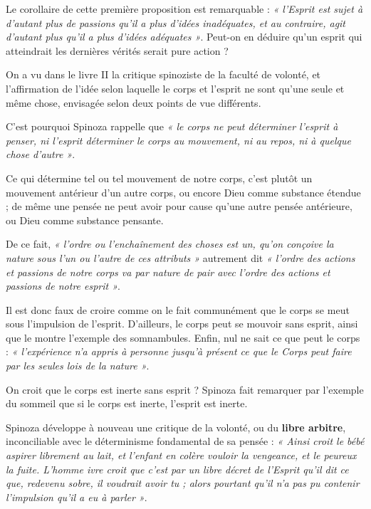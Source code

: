 Le corollaire de cette première proposition est remarquable : {\it « l’Esprit est
sujet à d’autant plus de passions qu’il a plus d’idées inadéquates, et au
contraire, agit d’autant plus qu’il a plus d’idées adéquates »}. Peut-on en
déduire qu’un esprit qui atteindrait les dernières vérités serait pure action ?

\vspace{0.5cm}
On a vu dans le livre II la critique spinoziste de la faculté de volonté, et
l’affirmation de l’idée selon laquelle le corps et l’esprit ne sont qu’une
seule et même chose, envisagée selon deux points de vue différents.

C’est pourquoi Spinoza rappelle que {\it « le corps ne peut déterminer l’esprit à
penser, ni l’esprit déterminer le corps au mouvement, ni au repos, ni à quelque
chose d’autre »}.

Ce qui détermine tel ou tel mouvement de notre corps, c’est plutôt un mouvement
antérieur d’un autre corps, ou encore Dieu comme substance étendue ; de même
une pensée ne peut avoir pour cause qu’une autre pensée antérieure, ou Dieu
comme substance pensante.

\vspace{0.5cm}
De ce fait, {\it « l’ordre ou l’enchaînement des choses est un, qu’on conçoive la
nature sous l’un ou l’autre de ces attributs »} autrement dit {\it « l’ordre des
actions et passions de notre corps va par nature de pair avec l’ordre des
actions et passions de notre esprit »}.

Il est donc faux de croire comme on le fait communément que le corps se meut
sous l’impulsion de l’esprit. D’ailleurs, le corps peut se mouvoir sans esprit,
ainsi que le montre l’exemple des somnambules. Enfin, nul ne sait ce que peut
le corps : {\it « l’expérience n’a appris à personne jusqu’à présent ce que le Corps
peut faire par les seules lois de la nature »}.

On croit que le corps est inerte sans esprit ? Spinoza fait remarquer par
l’exemple du sommeil que si le corps est inerte, l’esprit est inerte.

\vspace{0.5cm}
Spinoza développe à nouveau une critique de la volonté, ou du {\bf libre arbitre},
inconciliable avec le déterminisme fondamental de sa pensée : {\it « Ainsi croit le
bébé aspirer librement au lait, et l’enfant en colère vouloir la vengeance, et
le peureux la fuite. L’homme ivre croit que c’est par un libre décret de
l’Esprit qu’il dit ce que, redevenu sobre, il voudrait avoir tu ; alors
pourtant qu’il n’a pas pu contenir l’impulsion qu’il a eu à parler »}.

